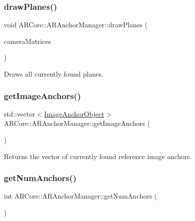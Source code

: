 \subsubsection{\texorpdfstring{draw\+Planes()}{drawPlanes()}}
{\footnotesize\ttfamily void A\+R\+Core\+::\+A\+R\+Anchor\+Manager\+::draw\+Planes (\begin{DoxyParamCaption}\item[{\mbox{\hyperlink{struct_a_r_common_1_1_a_r_camera_matrices}{A\+R\+Common\+::\+A\+R\+Camera\+Matrices}}}]{camera\+Matrices }\end{DoxyParamCaption})}



Draws all currently found planes. 

\mbox{\label{class_a_r_core_1_1_a_r_anchor_manager_a9e4f4cc3de7334ff38184f6a00b619f5}} 
\subsubsection{\texorpdfstring{get\+Image\+Anchors()}{getImageAnchors()}}
{\footnotesize\ttfamily std\+::vector$<$\mbox{\hyperlink{struct_a_r_objects_1_1_image_anchor_object}{Image\+Anchor\+Object}}$>$ A\+R\+Core\+::\+A\+R\+Anchor\+Manager\+::get\+Image\+Anchors (\begin{DoxyParamCaption}{ }\end{DoxyParamCaption})\hspace{0.3cm}{\ttfamily [inline]}}



Returns the vector of currently found reference image anchors. 

\mbox{\label{class_a_r_core_1_1_a_r_anchor_manager_a68b5139137f46a426374178cd43b653d}} 
\subsubsection{\texorpdfstring{get\+Num\+Anchors()}{getNumAnchors()}}
{\footnotesize\ttfamily int A\+R\+Core\+::\+A\+R\+Anchor\+Manager\+::get\+Num\+Anchors (\begin{DoxyParamCaption}{ }\end{DoxyParamCaption})\hspace{0.3cm}{\ttfamily [inline]}}



